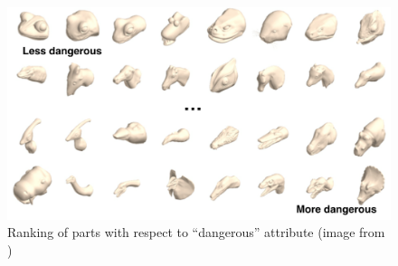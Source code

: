 \begin{figure}[tb]
\centering
    \includegraphics[width=1.0\columnwidth]{fig/search/chaudhuri_uist13_attr.png}
    \caption{
    Ranking of parts with respect to ``dangerous'' attribute (image from \cite{Chaudhuri:2013:ACC}) }
    \label{fig:attribit}
\end{figure}

